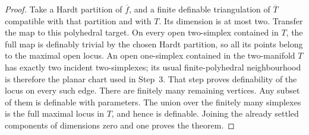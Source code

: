 \begin{proof}
Take a Hardt partition of $\overline f$, and a finite definable
triangulation of $\overline T$ compatible with that partition
and with $T$.  Its dimension is at most two.  Transfer the map
to this polyhedral target.  On every open two-simplex contained
in $T$, the full map is definably trivial by the chosen Hardt
partition, so all its points belong to the maximal open locus.
An open one-simplex contained in the two-manifold $T$ has exactly
two incident two-simplexes; its usual finite-polyhedral
neighbourhood is therefore the planar chart used in Step~3.
That step proves definability of the locus on every such edge.
There are finitely many remaining vertices.  Any subset of them
is definable with parameters.  The union over the finitely many
simplexes is the full maximal locus in $T$, and hence is
definable.  Joining the already settled components of dimensions
zero and one proves the theorem.
\end{proof}
